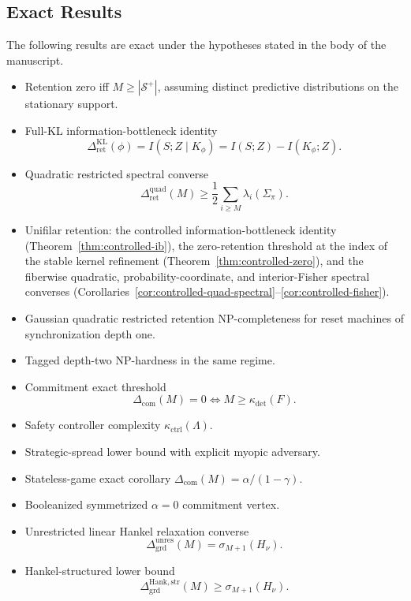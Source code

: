 \documentclass[12pt]{article}
\theoremstyle{definition}
\newcommand{\RetKL}{\Delta_{\mathrm{ret}}^{\mathrm{KL}}}
\newcommand{\RetQuad}{\Delta_{\mathrm{ret}}^{\mathrm{quad}}}
\newcommand{\Dunres}{\Delta_{\mathrm{grd}}^{\mathrm{unres}}}
\newcommand{\DHankstr}{\Delta_{\mathrm{grd}}^{\mathrm{Hank,str}}}
\newcommand{\Com}{\Delta_{\mathrm{com}}}
\newcommand{\Splus}{\mathcal S^{+}}
\begin{document}
\subsection{Exact Results}
\label{subsec:exact-results}

The following results are exact under the hypotheses stated in the body of the
manuscript.

\begin{itemize}[leftmargin=1.6em]
\item Retention zero iff $M\ge|\Splus|$, assuming distinct predictive
distributions on the stationary support.
\item Full-KL information-bottleneck identity
\[
\RetKL(\phi)=I(S;Z\mid K_\phi)
=
I(S;Z)-I(K_\phi;Z).
\]
\item Quadratic restricted spectral converse
\[
\RetQuad(M)
\ge
\frac12
\sum_{i\ge M}
\lambda_i(\Sigma_\pi).
\]
\item Unifilar retention: the controlled information-bottleneck identity
(Theorem~\ref{thm:controlled-ib}), the zero-retention threshold at the index of
the stable kernel refinement (Theorem~\ref{thm:controlled-zero}), and the
fiberwise quadratic, probability-coordinate, and interior-Fisher spectral
converses
(Corollaries~\ref{cor:controlled-quad-spectral}--\ref{cor:controlled-fisher}).
\item Gaussian quadratic restricted retention NP-completeness for reset
machines of synchronization depth one.
\item Tagged depth-two NP-hardness in the same regime.
\item Commitment exact threshold
\[
\Com(M)=0
\iff
M\ge\kappa_{\det}(F).
\]
\item Safety controller complexity $\kappa_{\mathrm{ctrl}}(\Lambda)$.
\item Strategic-spread lower bound with explicit myopic adversary.
\item Stateless-game exact corollary $\Com(M)=\alpha/(1-\gamma)$.
\item Booleanized symmetrized $\alpha=0$ commitment vertex.
\item Unrestricted linear Hankel relaxation converse
\[
\Dunres(M)
=
\sigma_{M+1}(H_\nu).
\]
\item Hankel-structured lower bound
\[
\DHankstr(M)\ge\sigma_{M+1}(H_\nu).
\]


\end{itemize}
\end{document}
